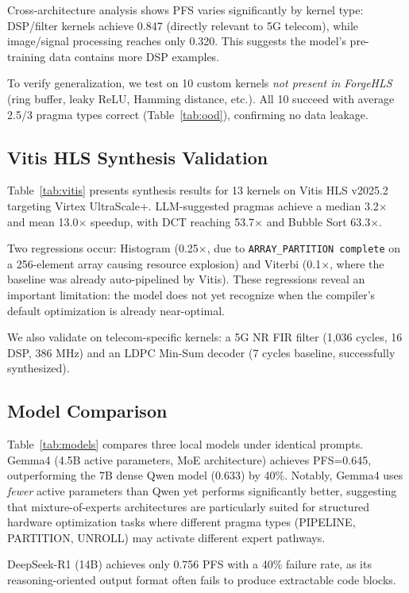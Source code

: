 \documentclass[conference]{IEEEtran}
\begin{document}
Cross-architecture analysis shows PFS varies significantly by kernel
type: DSP/filter kernels achieve 0.847 (directly relevant to 5G
telecom), while image/signal processing reaches only 0.320. This
suggests the model's pre-training data contains more DSP examples.

To verify generalization, we test on 10 custom kernels \emph{not present
in ForgeHLS} (ring buffer, leaky ReLU, Hamming distance, etc.).
All 10 succeed with average 2.5/3 pragma types correct
(Table~\ref{tab:ood}), confirming no data leakage.

\subsection{Vitis HLS Synthesis Validation}

Table~\ref{tab:vitis} presents synthesis results for 13 kernels on Vitis HLS
v2025.2 targeting Virtex UltraScale+. LLM-suggested pragmas achieve a median
3.2$\times$ and mean 13.0$\times$ speedup, with DCT reaching 53.7$\times$ and
Bubble Sort 63.3$\times$.

Two regressions occur: Histogram (0.25$\times$, due to \texttt{ARRAY\_PARTITION
complete} on a 256-element array causing resource explosion) and Viterbi
(0.1$\times$, where the baseline was already auto-pipelined by Vitis).
These regressions reveal an important limitation: the model does not yet
recognize when the compiler's default optimization is already near-optimal.

We also validate on telecom-specific kernels: a 5G NR FIR filter
(1,036 cycles, 16 DSP, 386 MHz) and an LDPC Min-Sum decoder
(7 cycles baseline, successfully synthesized).

\subsection{Model Comparison}

Table~\ref{tab:models} compares three local models under identical prompts.
Gemma4 (4.5B active parameters, MoE architecture) achieves PFS=0.645,
outperforming the 7B dense Qwen model (0.633) by 40\%.
Notably, Gemma4 uses \emph{fewer} active parameters than Qwen yet performs
significantly better, suggesting that mixture-of-experts architectures
are particularly suited for structured hardware optimization tasks where
different pragma types (PIPELINE, PARTITION, UNROLL) may activate
different expert pathways.

DeepSeek-R1 (14B) achieves only 0.756 PFS with a 40\% failure rate,
as its reasoning-oriented output format often fails to produce
extractable code blocks.
\end{document}
